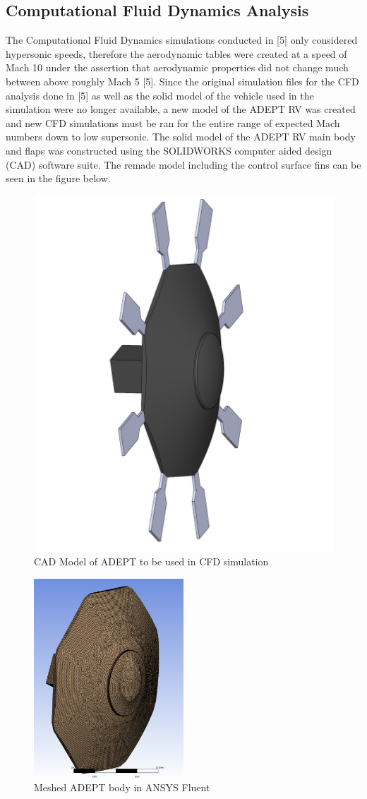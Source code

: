 \documentclass[12pt]{article}
\numberwithin{equation}{section}
\numberwithin{figure}{section}
\numberwithin{table}{section}
\begin{document}
\subsection{Computational Fluid Dynamics Analysis}
The Computational Fluid Dynamics simulations conducted in [5] only considered hypersonic speeds, therefore the aerodynamic tables were created at a speed of Mach 10 under the assertion that aerodynamic properties did not change much between above roughly Mach 5 [5]. Since the original simulation files for the CFD analysis done in [5] as well as the solid model of the vehicle used in the simulation were no longer available, a new model of the ADEPT RV was created and new CFD simulations must be ran for the entire range of expected Mach numbers down to low supersonic. The solid model of the ADEPT RV main body and flaps was constructed using the SOLIDWORKS computer aided design (CAD) software suite. The remade model including the control surface fins can be seen in the figure below.

\begin{figure}[H]
  \centering
  \includegraphics[height=0.5\textwidth]{Figures/ADEPT_CAD.png}
  \caption{CAD Model of ADEPT to be used in CFD simulation}
  \label{fig:DONG}
\end{figure}

\begin{figure}[H]
  \centering
  \includegraphics[width=0.5\textwidth]{Figures/ADPEPT_Body_Meshed.png}
  \caption{Meshed ADEPT body in ANSYS Fluent}
  \label{fig:Mesh}
\end{figure}
\end{document}
